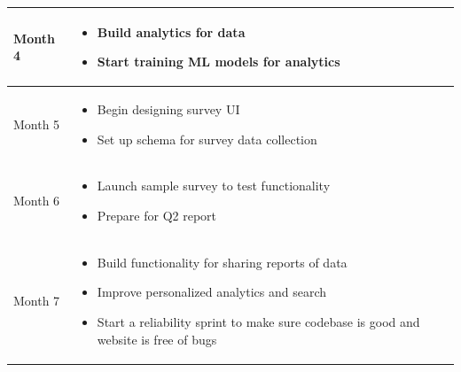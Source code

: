 \begin{table}[H]
\begin{tabularx}{\textwidth}{|l|X|}
      Month 4 & \begin{minipage}{\linewidth}
        \vspace{6pt}
        \begin{itemize}[itemsep=3pt,parsep=-1pt,leftmargin=*]
        \item Build analytics for data
        \item Start training ML models for analytics
        \end{itemize}
        \vspace{-2pt}
        \end{minipage}\\\hline
      Month 5 & \begin{minipage}{\linewidth}
        \vspace{6pt}
        \begin{itemize}[itemsep=3pt,parsep=-1pt,leftmargin=*]
        \item Begin designing survey UI 
        \item Set up schema for survey data collection
        \end{itemize}
        \vspace{-2pt}
        \end{minipage}\\\hline
      Month 6 & \begin{minipage}{\linewidth}
        \vspace{6pt}
        \begin{itemize}[itemsep=3pt,parsep=-1pt,leftmargin=*]
        \item Launch sample survey to test functionality
        \item Prepare for Q2 report
        \end{itemize}
        \vspace{-2pt}
        \end{minipage}\\\hline
      Month 7 & \begin{minipage}{\linewidth}
        \vspace{6pt}
        \begin{itemize}[itemsep=3pt,parsep=-1pt,leftmargin=*]
        \item Build functionality for sharing reports of data
        \item Improve personalized analytics and search
        \item Start a reliability sprint to make sure codebase is good and website is free of bugs
        \end{itemize}

\end{minipage}
\end{tabularx}
\end{table}
